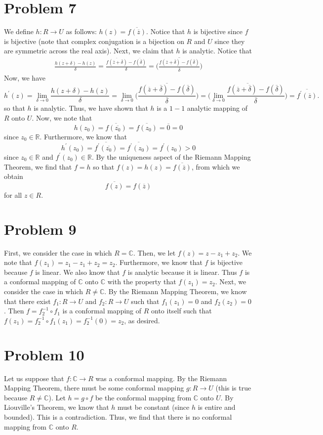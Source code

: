 \documentclass[12pt]{article}
\newcommand{\cc}{{\mathbb C}}
\newcommand{\rr}{{\mathbb R}}
\begin{document}
\section*{Problem 7}
We define $h: R \rightarrow U$ as follows: $h(z) = \overline{f(\overline{z})}$. Notice that $h$ is bijective since $f$ is bijective (note that complex conjugation is a bijection on $R$ and $U$ since they are symmetric across the real axis). Next, we claim that $h$ is analytic. Notice that
\begin{align*}
\frac{h(z+\delta) - h(z)}{\delta} = \frac{{\overline{f(\overline{z}+\overline{\delta})} - \overline{f(\overline{\delta})}}}{\delta} = \overline{\bigg(\frac{f(\overline{z}+\overline{\delta})-f(\overline{\delta})}{\overline{\delta}}\bigg)}
\end{align*} Now, we have
\[
h^\prime(z) = \lim_{\delta \rightarrow 0} \frac{h(z+\delta) - h(z)}{\delta} = \lim_{\delta \rightarrow 0} \overline{\bigg(\frac{f(\overline{z}+\overline{\delta})-f(\overline{\delta})}{\overline{\delta}}\bigg)} = \overline{\bigg(\lim_{\delta \rightarrow 0} \frac{f(\overline{z}+\overline{\delta}) - f(\overline{\delta})}{\overline{\delta}} \bigg)} = \overline{f^\prime(\overline{z})}.
\] so that $h$ is analytic. Thus, we have shown that $h$ is a $1-1$ analytic mapping of $R$ onto $U$. Now, we note that
\[
h(z_0) = \overline{f(\overline{z_0})} = \overline{f(z_0)} = \overline{0} = 0
\] since $z_0 \in \rr$. Furthermore, we know that
\[
h^\prime(z_0) = \overline{f^\prime(\overline{z_0})} = \overline{f^\prime(z_0)} = f^\prime(z_0) > 0
\] since $z_0 \in \rr$ and $f^\prime(z_0) \in \rr$. By the uniqueness aspect of the Riemann Mapping Theorem, we find that $f = h$ so that $f(z) = h(z) = \overline{f(\overline{z})}$, from which we obtain
\[
\overline{f(z)} = f(\overline{z})
\] for all $z \in R$.
\newpage
\section*{Problem 9}
First, we consider the case in which $R = \cc$. Then, we let $f(z) = z - z_1 + z_2$. We note that $f(z_1) = z_1 - z_1 + z_2 = z_2$. Furthermore, we know that $f$ is bijective because $f$ is linear. We also know that $f$ is analytic because it is linear. Thus $f$ is a conformal mapping of $\cc$ onto $\cc$ with the property that $f(z_1) = z_2$. Next, we consider the case in which $R \neq \cc$. By the Riemann Mapping Theorem, we know that there exist $f_1: R \rightarrow U$ and $f_2: R \rightarrow U$ such that $f_1(z_1) = 0$ and $f_2(z_2) = 0$. Then $f = f_2^{-1} \circ f_1$ is a conformal mapping of $R$ onto itself such that $f(z_1) = f_2^{-1} \circ f_1(z_1) = f_2^{-1}(0) = z_2$, as desired.
\newpage
\section*{Problem 10}
Let us suppose that $f: \cc \rightarrow R$ was a conformal mapping. By the Riemann Mapping Theorem, there must be some conformal mapping $g: R \rightarrow U$ (this is true because $R \neq \cc$). Let $h = g \circ f$ be the conformal mapping from $\cc$ onto $U$. By Liouville's Theorem, we know that $h$ must be constant (since $h$ is entire and bounded). This is a contradiction. Thus, we find that there is no conformal mapping from $\cc$ onto $R$.
\end{document}
